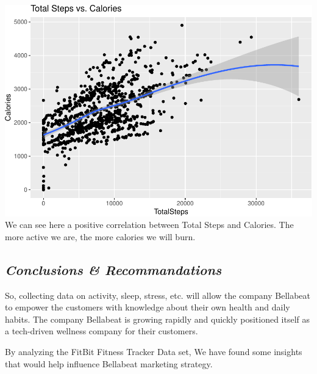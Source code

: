 \documentclass[
]{article}
\begin{document}
\includegraphics{Bellabeat_files/figure-latex/unnamed-chunk-19-1.pdf} We
can see here a positive correlation between Total Steps and Calories.
The more active we are, the more calories we will burn.

\hypertarget{conclusions-recommandations}{%
\subsection{\texorpdfstring{\textbf{\emph{Conclusions \&
Recommandations}}}{Conclusions \& Recommandations}}\label{conclusions-recommandations}}

So, collecting data on activity, sleep, stress, etc. will allow the
company Bellabeat to empower the customers with knowledge about their
own health and daily habits. The company Bellabeat is growing rapidly
and quickly positioned itself as a tech-driven wellness company for
their customers.

By analyzing the FitBit Fitness Tracker Data set, We have found some
insights that would help influence Bellabeat marketing strategy.
\end{document}
